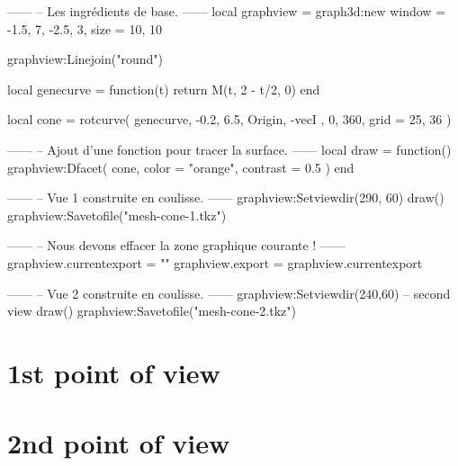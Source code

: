 \documentclass[varwidth]{standalone}
\begin{document}
\begin{luadraw}{}
------
-- Les ingrédients de base.
------
local graphview = graph3d:new{
  window = {-1.5, 7, -2.5, 3},
  size   = {10, 10}
}

graphview:Linejoin("round")

local genecurve = function(t)
  return M(t, 2 - t/2, 0)
end

local cone = rotcurve(
  genecurve, -0.2, 6.5,
  {
    Origin, -vecI
  },
  0, 360,
  {
    grid = {25, 36}
  })

------
-- Ajout d'une fonction pour tracer la surface.
------
local draw = function()
  graphview:Dfacet(
    cone,
    {
      color  = "orange",
      contrast = 0.5
    })
end

------
-- Vue 1 construite en coulisse.
------
graphview:Setviewdir(290, 60)
draw()
graphview:Savetofile("mesh-cone-1.tkz")

------
-- Nous devons effacer la zone graphique courante !
------
graphview.currentexport = {""}
graphview.export        = graphview.currentexport

------
-- Vue 2 construite en coulisse.
------
graphview:Setviewdir(240,60) -- second view
draw()
graphview:Savetofile("mesh-cone-2.tkz")
\end{luadraw}

\section*{1st point of view}




\section*{2nd point of view}


\end{document}

